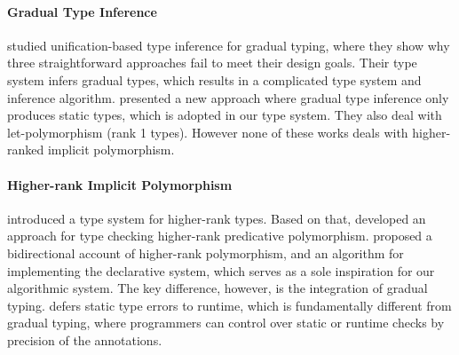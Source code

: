 \paragraph{Gradual Type Inference }
\citet{siek2008gradual} studied unification-based type inference for gradual
typing, where they show why three straightforward approaches fail to meet their
design goals. Their type system infers gradual types, which results in a
complicated type system and inference algorithm.
\citet{garcia2015principal} presented a new approach
where gradual type inference only produces static types, which is adopted in our
type system. They also deal with let-polymorphism (rank 1 types).
However none of these works deals with higher-ranked implicit polymorphism.


\paragraph{Higher-rank Implicit Polymorphism}

\citet{odersky1996putting} introduced a type system for higher-rank types. Based
on that, \citet{jones2007practical} developed an approach for type checking
higher-rank predicative polymorphism. \citet{dunfield2013complete} proposed a
bidirectional account of higher-rank polymorphism, and an algorithm for
implementing the declarative system, which serves as a sole inspiration for our
algorithmic system. The key difference, however, is the integration of gradual
typing. \citet{vytiniotis2012defer} defers static type errors to runtime, which
is fundamentally different from gradual typing, where programmers can control
over static or runtime checks by precision of the annotations.

